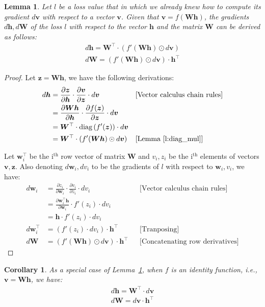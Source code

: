 \documentclass[12pt]{report}
\newcommand{\lemmaref}[1]{Lemma~\ref{#1}}
\newcommand{\fracder}[2]{\frac{\partial #1}{\partial #2}}
\newcommand{\tp}[1]{#1^\top}
\newcommand{\paren}[1]{\left(#1\right)}
\newcommand{\der}[1]{d\bm{#1}}
\newtheorem{lemma}{Lemma}
\newtheorem{corollary}{Corollary}
\begin{document}
\begin{lemma}
\label{l:chain_rule}
Let $l$ be a loss value that  in which we
already knew how to compute its gradient $\der{v}$ with respect to a vector $\bm{v}$. Given that
$\bm{v} = f(\bm{Wh})$, the gradients $\der{h}, \der{W}$ of the loss $l$ with respect to the vector
$\bm{h}$ and the matrix $\bm{W}$ can be derived as follows:
\begin{align}
\der{h} = \tp{\bm{W}} \cdot \paren{f'(\bm{Wh}) \odot \der{v}}
\\
\der{W} = \paren{f'(\bm{Wh}) \odot \der{v}} \cdot \tp{\bm{h}} 
\end{align}
\end{lemma}

\begin{proof}
Let $\bm{z} = \bm{Wh}$, we have the following derivations: %
\begin{align*}
\der{h} &= \fracder{\bm{z}}{\bm{h}} \cdot \fracder{\bm{v}}{\bm{z}}
\cdot \der{v} && \text{[Vector calculus chain rules]}\\
&= \fracder{\bm{Wh}}{\bm{h}} \cdot \fracder{f(\bm{z})}{\bm{z}}
\cdot \der{v} \\
&=\tp{\bm{W}} \cdot \diag \paren{f'(\bm{z})} \cdot \der{v} \\
&=\tp{\bm{W}} \cdot \paren{f'(\bm{Wh}) \odot \der{v}} &&
\text{[\lemmaref{l:diag_mul}]}
\end{align*}

Let $\tp{\bm{w}_i}$ be the i$^{\text{th}}$ row vector of matrix $\bm{W}$ and
$v_i, z_i$ be the i$^{\text{th}}$ elements of vectors $\bm{v}, \bm{z}$. Also
denoting $\der{w}_i, dv_i$ to be the gradients of $l$ with respect to $\bm{w}_i,
v_i$, we have:
\begin{align*}
d\bm{w}_i &= \fracder{z_i}{\bm{w}_i} \cdot \fracder{v_i}{z_i}
\cdot dv_i && \text{[Vector calculus chain rules]}\\
&= \fracder{\tp{\bm{w}_i}\bm{h}}{\bm{w}_i} \cdot f'(z_i) \cdot dv_i \\
&= \bm{h} \cdot f'(z_i) \cdot dv_i \\ 
d\tp{\bm{w}_i} &= \paren{f'(z_i) \cdot dv_i} \cdot
\tp{\bm{h}} && \text{[Tranposing]} \\
\der{W} &= \paren{f'(\bm{Wh}) \odot \der{v}} \cdot \tp{\bm{h}}
&& \text{[Concatenating row derivatives]}
\end{align*}
\end{proof}

\begin{corollary}
\label{c:chain_rule}
As a special case of \lemmaref{l:chain_rule}, when $f$ is an identity function,
i.e., $\bm{v} = \bm{Wh}$, we have:
\begin{align}
\der{h} = \tp{\bm{W}} \cdot \der{v}
\\
\der{W} = \der{v} \cdot \tp{\bm{h}} 
\end{align}
\end{corollary}

%



\end{document}
